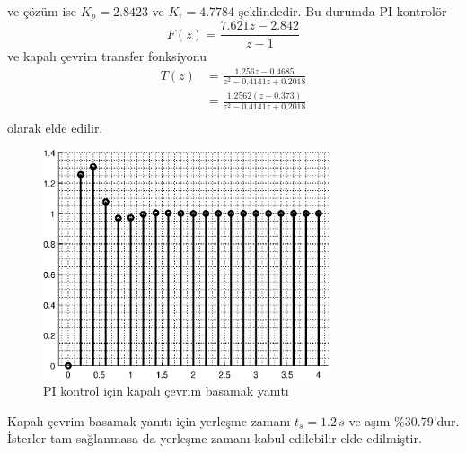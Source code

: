 ve çözüm ise $K_p=2.8423$ ve $K_i=4.7784$ şeklindedir. Bu durumda PI kontrolör
\begin{equation}
        F(z)=\frac{7.621 z - 2.842}{z-1}
\end{equation}
ve kapalı çevrim transfer fonksiyonu
\begin{equation}
\begin{split}
    T(z)&=\frac{1.256 z - 0.4685}{z^2 - 0.4141 z + 0.2018}\\
    &=\frac{1.2562 (z-0.373)}{z^2 - 0.4141 z + 0.2018}\\
\end{split}
\end{equation}
olarak elde edilir.
\begin{figure}[!htb]
    \centering
    \includegraphics[width=0.75\textwidth]{img/lec9_step1}
    \caption{PI kontrol için kapalı çevrim basamak yanıtı}
    \label{fig:lec9_step1}
\end{figure}

Kapalı çevrim basamak yanıtı için yerleşme zamanı $t_s=1.2\,s$ ve aşım $\%30.79$'dur. İsterler tam sağlanmasa da yerleşme zamanı kabul edilebilir elde edilmiştir. 